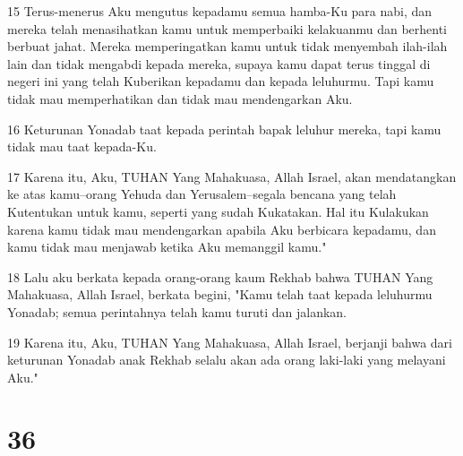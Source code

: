 \par 15 Terus-menerus Aku mengutus kepadamu semua hamba-Ku para nabi, dan mereka telah menasihatkan kamu untuk memperbaiki kelakuanmu dan berhenti berbuat jahat. Mereka memperingatkan kamu untuk tidak menyembah ilah-ilah lain dan tidak mengabdi kepada mereka, supaya kamu dapat terus tinggal di negeri ini yang telah Kuberikan kepadamu dan kepada leluhurmu. Tapi kamu tidak mau memperhatikan dan tidak mau mendengarkan Aku.
\par 16 Keturunan Yonadab taat kepada perintah bapak leluhur mereka, tapi kamu tidak mau taat kepada-Ku.
\par 17 Karena itu, Aku, TUHAN Yang Mahakuasa, Allah Israel, akan mendatangkan ke atas kamu--orang Yehuda dan Yerusalem--segala bencana yang telah Kutentukan untuk kamu, seperti yang sudah Kukatakan. Hal itu Kulakukan karena kamu tidak mau mendengarkan apabila Aku berbicara kepadamu, dan kamu tidak mau menjawab ketika Aku memanggil kamu."
\par 18 Lalu aku berkata kepada orang-orang kaum Rekhab bahwa TUHAN Yang Mahakuasa, Allah Israel, berkata begini, "Kamu telah taat kepada leluhurmu Yonadab; semua perintahnya telah kamu turuti dan jalankan.
\par 19 Karena itu, Aku, TUHAN Yang Mahakuasa, Allah Israel, berjanji bahwa dari keturunan Yonadab anak Rekhab selalu akan ada orang laki-laki yang melayani Aku."

\chapter{36}

